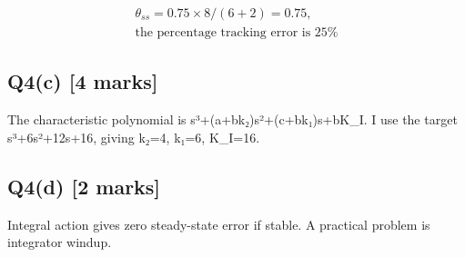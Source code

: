 \documentclass[11pt,a4paper]{article}
\begin{document}
\[\begin{aligned}\theta_{ss} = 0.75\times8/(6+2)=0.75,\\ \text{the percentage tracking error is 25\%}\end{aligned}\]

\subsection*{Q4(c) \hfill [4 marks]}

The characteristic polynomial is s³+(a+bk₂)s²+(c+bk₁)s+bK\_I.
I use the target s³+6s²+12s+16, giving k₂=4, k₁=6, K\_I=16.

\subsection*{Q4(d) \hfill [2 marks]}

Integral action gives zero steady-state error if stable.
A practical problem is integrator windup.
\end{document}
